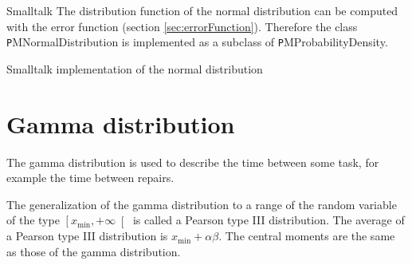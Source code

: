 \begin{displaycode}{Smalltalk}
The distribution function of the normal distribution can be
computed with the error function (\cf section
\ref{sec:errorFunction}). Therefore the class {\texttt
PMNormalDistribution} is implemented as a subclass of {\texttt
PMProbabilityDensity}.

\begin{listing} Smalltalk implementation of the normal distribution \label{ls:normdist}

\end{listing}

\section{Gamma distribution}
\label{sec:gammadist} The gamma distribution is used to describe
the time between some task, for example the time between repairs.

The generalization of the gamma distribution to a range of the
random variable of the type $\left[x_{\min},+\infty\right[$ is
called a Pearson type III distribution. The average of a Pearson
type III distribution is $x_{\min}+\alpha\beta$. The central
moments are the same as those of the gamma distribution.


\end{displaycode}
